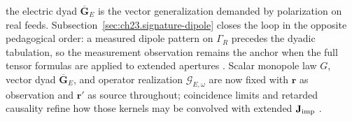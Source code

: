 the electric dyad $\overline{\mathbf{G}}_{E}$ is the vector generalization demanded
by polarization on real feeds. Subsection~\ref{sec:ch23.signature-dipole} closes the
loop in the opposite pedagogical order: a measured dipole pattern on $\Gamma_R$
precedes the dyadic tabulation, so the measurement observation remains the anchor
when the full tensor formulas are applied to extended apertures
\cite{jackson1999}. Scalar monopole law $G$, vector dyad
$\overline{\mathbf{G}}_{E}$, and operator realization $\mathcal{G}_{E,\omega}$ are now fixed with
$\mathbf{r}$ as observation and $\mathbf{r}'$ as source throughout; coincidence limits and
retarded causality refine how those kernels may be convolved with extended $\mathbf{J}_{\mathrm{imp}}$
\cite{stratton1941}.

